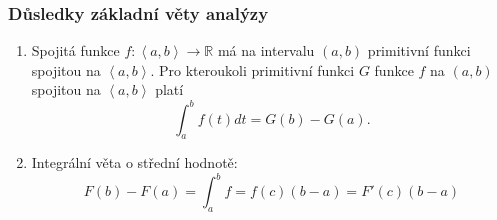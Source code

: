\documentclass[../main.tex]{subfiles}
\begin{document}
\subsubsection{Důsledky základní věty analýzy}
\hspace{1.2mm}
\begin{enumerate}
    \item Spojitá funkce $f : \left<a,b\right> \rightarrow \mathbb{R}$ má na intervalu $(a,b)$ primitivní funkci spojitou na $\left<a,b\right>$.
          Pro kteroukoli primitivní funkci $G$ funkce $f$ na $(a,b)$ spojitou na $\left<a,b\right>$ platí
          \[\int^b_a f(t)dt = G(b) - G(a).\]
    \item Integrální věta o střední hodnotě:
    \[F(b) - F(a) = \int^b_a f = f(c)(b-a) = F'(c)(b-a)\]
\end{enumerate}
\noindent
\end{document}
